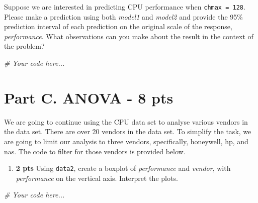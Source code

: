 \documentclass[
]{article}
\newenvironment{Shaded}{\begin{snugshade}}{\end{snugshade}}
\newcommand{\CommentTok}[1]{\textcolor[rgb]{0.56,0.35,0.01}{\textit{#1}}}
\newcommand{\FunctionTok}[1]{\textcolor[rgb]{0.00,0.00,0.00}{#1}}
\newcommand{\NormalTok}[1]{#1}
\newcommand{\OtherTok}[1]{\textcolor[rgb]{0.56,0.35,0.01}{#1}}
\newcommand{\SpecialCharTok}[1]{\textcolor[rgb]{0.00,0.00,0.00}{#1}}
\newcommand{\StringTok}[1]{\textcolor[rgb]{0.31,0.60,0.02}{#1}}
\providecommand{\tightlist}{%
  \setlength{\itemsep}{0pt}\setlength{\parskip}{0pt}}
\begin{document}
Suppose we are interested in predicting CPU performance when
\texttt{chmax\ =\ 128}. Please make a prediction using both
\emph{model1} and \emph{model2} and provide the 95\% prediction interval
of each prediction on the original scale of the response,
\emph{performance}. What observations can you make about the result in
the context of the problem?

\begin{Shaded}
\begin{Highlighting}[]
\CommentTok{\# Your code here...}
\end{Highlighting}
\end{Shaded}

\hypertarget{part-c.-anova---8-pts}{%
\section{Part C. ANOVA - 8 pts}\label{part-c.-anova---8-pts}}

We are going to continue using the CPU data set to analyse various
vendors in the data set. There are over 20 vendors in the data set. To
simplify the task, we are going to limit our analysis to three vendors,
specifically, honeywell, hp, and nas. The code to filter for those
vendors is provided below.

\begin{Shaded}
\end{Shaded}

\begin{enumerate}
\def\labelenumi{\arabic{enumi}.}
\tightlist
\item
  \textbf{2 pts} Using \texttt{data2}, create a boxplot of
  \emph{performance} and \emph{vendor}, with \emph{performance} on the
  vertical axis. Interpret the plots.
\end{enumerate}

\begin{Shaded}
\begin{Highlighting}[]
\CommentTok{\# Your code here...}
\end{Highlighting}
\end{Shaded}
\end{document}

